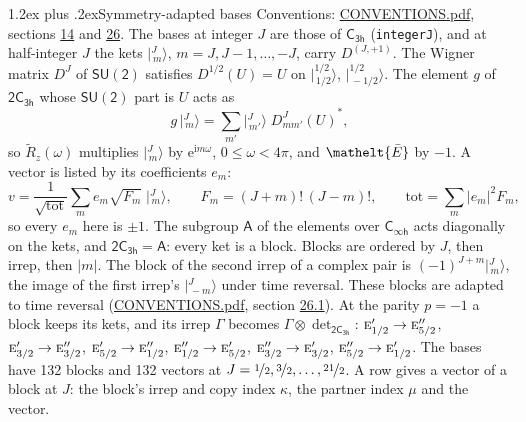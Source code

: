 \documentclass[10pt,a4paper]{article}
\makeatletter
\renewcommand\section{\@startsection{section}{1}{\z@}{-3ex plus -1ex minus -.2ex}%
  {1.2ex plus .2ex}{\normalfont\large\sffamily\bfseries\color{parttitle}}}
\numberwithin{equation}{section}
\newcommand{\eltfont}[1]{{\let\sigma\eltsigma\mathelt{#1}}}
\newcommand{\grp}[1]{\mathsf{#1}}
\newcommand{\irr}[1]{\text{\normalfont\scshape #1}}
\newcommand{\elt}[1]{\eltfont{#1}}
\newcommand{\iunit}{\mathrm{i}}
\newcommand{\expe}{\mathrm{e}}
\newcommand{\irrJp}[2]{D^{(#1,#2)}}
\newcommand{\wignerD}[1]{D^{#1}}
\newcommand{\conj}[1]{{#1}^{*}}
\newcommand{\irrprod}{\otimes}
\newcommand{\mult}{\kappa}
\newcommand{\intx}{\mu}
\newcommand{\jm}[2]{\bigl\lvert{}^{#1}_{\,#2}\bigr\rangle}
\newcommand{\barred}[1]{\bar{#1}}
\newcommand{\lift}[1]{\tilde{#1}}
\makeatother
\begin{document}
\section{Symmetry-adapted bases}\label{s:bases}
Conventions: \href{../../CONVENTIONS.pdf}{CONVENTIONS.pdf}, sections \href{../../../rotation/CONVENTIONS.pdf\#conv.14}{14} and \href{../../CONVENTIONS.pdf\#conv.26}{26}.
\leavevmode\label{n:index.m}\label{n:vector.ket}The bases at integer $J$ are those of \href{../../../rotation/data/pdf/C3h.pdf}{$\grp{C_{3h}}$} (\texttt{integerJ}), and at half-integer $J$ the kets $\jm{J}{m}$, $m = J, J-1, \dots, -J$, carry $\irrJp{J}{+1}$. \label{n:matrix.wigner}The Wigner matrix $\wignerD{J}$ of $\grp{SU(2)}$ satisfies $\wignerD{1/2}(U) = U$ on $\jm{1/2}{1/2}$, $\jm{1/2}{-1/2}$. The element $g$ of $\grp{2C_{3h}}$ whose $\grp{SU(2)}$ part is $U$ acts as
\begin{equation}\label{e:action}g\,\jm{J}{m} = \sum_{m'} \jm{J}{m'}\; \conj{\wignerD{J}_{m m'}(U)},\end{equation}
so $\lift{R}_{z}(\omega)$ multiplies $\jm{J}{m}$ by $\expe^{\iunit m\omega}$, $0 \le \omega < 4\pi$, and $\elt{\barred{E}}$ by $-1$. \label{n:index.ketcoefficient}\label{n:vector.basis.symmetry}\label{n:index.ketweight}\label{n:index.total}A vector is listed by its coefficients $e_m$:
\begin{equation}\label{e:ket}v = \frac{1}{\sqrt{\mathrm{tot}}}\sum_m e_m\sqrt{F_m}\;\jm{J}{m},\qquad F_m = (J+m)!\,(J-m)!,\qquad \mathrm{tot} = \sum_m |e_m|^2F_m,\end{equation}
so every $e_m$ here is $\pm 1$.
\leavevmode\label{n:group.A}The subgroup $\grp{A}$ of the elements over $\grp{C_{\infty h}}$ acts diagonally on the kets, and $\grp{2C_{3h}} = \grp{A}$: every ket is a block. Blocks are ordered by $J$, then irrep, then $|m|$. The block of the second irrep of a complex pair is $(-1)^{J+m}\jm{J}{m}$, the image of the first irrep's $\jm{J}{-m}$ under time reversal. These blocks are adapted to time reversal (\href{../../CONVENTIONS.pdf}{CONVENTIONS.pdf}, section \href{../../CONVENTIONS.pdf\#conv.26.1}{26.1}).
At the parity $p = -1$ a block keeps its kets, and its irrep $\Gamma$ becomes $\Gamma \irrprod \det_{\grp{2C_{3h}}}$: $\irr{e}_{1/2}' \to \irr{e}_{5/2}''$, $\irr{e}_{3/2}' \to \irr{e}_{3/2}''$, $\irr{e}_{5/2}' \to \irr{e}_{1/2}''$, $\irr{e}_{1/2}'' \to \irr{e}_{5/2}'$, $\irr{e}_{3/2}'' \to \irr{e}_{3/2}'$, $\irr{e}_{5/2}'' \to \irr{e}_{1/2}'$.
The bases have 132 blocks and 132 vectors at $J = \nicefrac{1}{2}, \nicefrac{3}{2}, \dots, \nicefrac{21}{2}$. \label{n:index.copy}\label{n:head.vector}A row gives a vector of a block at $J$: the block's irrep and copy index $\mult$, the partner index $\intx$ and the vector.
\end{document}
